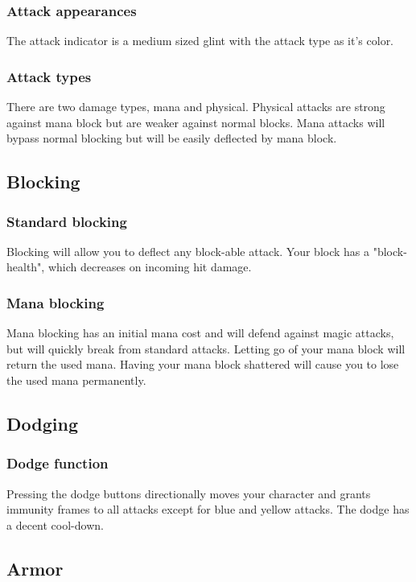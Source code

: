 \documentclass{report}
\begin{document}
        \subsubsection{Attack appearances}
        The attack indicator is a medium sized glint with the attack type as it's color.

        \subsubsection{Attack types}
        There are two damage types, mana and physical. Physical attacks are strong against mana block but are weaker against normal blocks. Mana attacks will bypass normal blocking but will be easily deflected by mana block.
    
    \subsection{Blocking}

        \subsubsection{Standard blocking}
        Blocking will allow you to deflect  any block-able attack. Your block has a "block-health", which decreases on incoming hit damage.

        \subsubsection{Mana blocking}
        Mana blocking has an initial mana cost and will defend against magic attacks, but will quickly break from standard attacks. Letting go of your mana block will return the used mana. Having your mana block shattered will cause you to lose the used mana permanently.
    
    \subsection{Dodging}
    
        \subsubsection{Dodge function}
        Pressing the dodge buttons directionally moves your character and grants immunity frames to all attacks except for  blue and yellow attacks. The dodge has a decent cool-down.
    
    \subsection{Armor}
\end{document}
